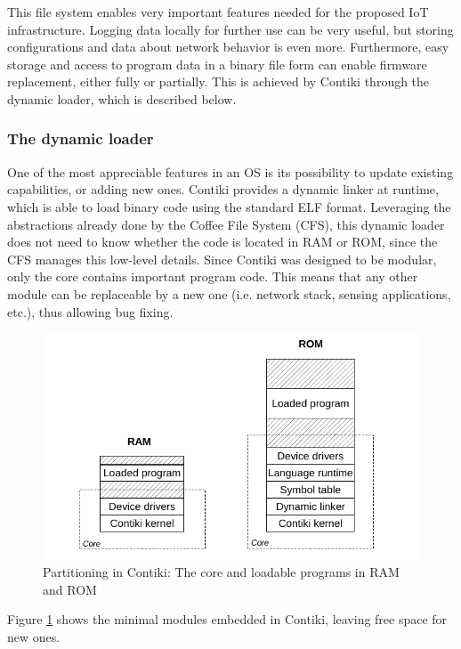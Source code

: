 This file system enables very important features needed for the proposed IoT infrastructure.
Logging data locally for further use can be very useful, but storing configurations and data about network behavior is even more.
Furthermore, easy storage and access to program data in a binary file form can enable firmware replacement, either fully or partially.
This is achieved by Contiki through the dynamic loader, which is described below.

\subsubsection{The dynamic loader}
One of the most appreciable features in an OS is its possibility to update existing capabilities, or adding new ones.
Contiki provides a dynamic linker at runtime, which is able to load binary code using the standard ELF format\cite{tis1995tool}.
Leveraging the abstractions already done by the Coffee File System (CFS), this dynamic loader does not need to know whether the code is located in RAM or ROM, since the CFS manages this low-level details.
Since Contiki was designed to be modular, only the core contains important program code.
This means that any other module can be replaceable by a new one (i.e. network stack, sensing applications, etc.), thus allowing bug fixing.

\begin{figure}[htb]
	\centering
	\includegraphics[width=1\columnwidth]{chapters/background.images/ContikiModules.pdf}
	\caption{Partitioning in Contiki: The core and loadable programs in RAM and ROM\cite{dunkels06runtime}}
	\label{fig:ContikiModules}
\end{figure}

Figure \ref{fig:ContikiModules} shows the minimal modules embedded in Contiki, leaving free space for new ones.

